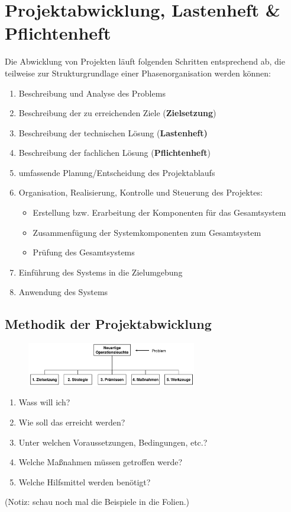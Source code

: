 \documentclass[11pt,a4paper]{article}
\begin{document}
\section{Projektabwicklung, Lastenheft \& Pflichtenheft}

Die Abwicklung von Projekten läuft folgenden Schritten entsprechend ab,
die teilweise zur Strukturgrundlage einer Phasenorganisation werden können:

\begin{enumerate}
\item Beschreibung und Analyse des Problems
\item Beschreibung der zu erreichenden Ziele (\textbf{Zielsetzung})
\item Beschreibung der technischen Lösung (\textbf{Lastenheft)}
\item Beschreibung der fachlichen Lösung (\textbf{Pflichtenheft})
\item umfassende Planung/Entscheidung des Projektablaufs
\item Organisation, Realisierung, Kontrolle und Steuerung des Projektes:
	\begin{itemize}
	\item Erstellung bzw. Erarbeitung der Komponenten für das Gesamtsystem
	\item Zusammenfügung der Systemkomponenten zum Gesamtsystem
	\item Prüfung des Gesamtsystems
	\end{itemize}
\item Einführung des Systems in die Zielumgebung
\item Anwendung des Systems
\end{enumerate}

\subsection{Methodik der Projektabwicklung}
\begin{figure}[H]
	\centering

	\includegraphics[width=0.66\textwidth]{ch6/methodik}

\end{figure}

\begin{enumerate}
\item Wass will ich?
\item Wie soll das erreicht werden?
\item Unter welchen Voraussetzungen, Bedingungen, etc.?
\item Welche Maßnahmen müssen getroffen werde?
\item Welche Hilfsmittel werden benötigt?
\end{enumerate}	
\noindent
(Notiz: schau noch mal die Beispiele in die Folien.)
\end{document}
